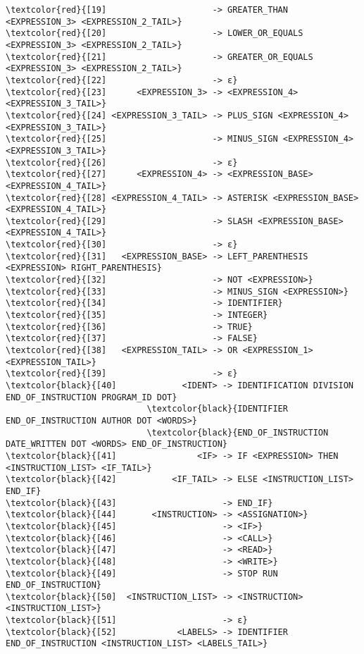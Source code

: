 \begin{Verbatim}[commandchars=\\\{\}]
\textcolor{red}{[19]                     -> GREATER_THAN <EXPRESSION_3> <EXPRESSION_2_TAIL>}
\textcolor{red}{[20]                     -> LOWER_OR_EQUALS <EXPRESSION_3> <EXPRESSION_2_TAIL>}
\textcolor{red}{[21]                     -> GREATER_OR_EQUALS <EXPRESSION_3> <EXPRESSION_2_TAIL>}
\textcolor{red}{[22]                     -> ε}
\textcolor{red}{[23]      <EXPRESSION_3> -> <EXPRESSION_4> <EXPRESSION_3_TAIL>}
\textcolor{red}{[24] <EXPRESSION_3_TAIL> -> PLUS_SIGN <EXPRESSION_4> <EXPRESSION_3_TAIL>}
\textcolor{red}{[25]                     -> MINUS_SIGN <EXPRESSION_4> <EXPRESSION_3_TAIL>}
\textcolor{red}{[26]                     -> ε}
\textcolor{red}{[27]      <EXPRESSION_4> -> <EXPRESSION_BASE> <EXPRESSION_4_TAIL>}
\textcolor{red}{[28] <EXPRESSION_4_TAIL> -> ASTERISK <EXPRESSION_BASE> <EXPRESSION_4_TAIL>}
\textcolor{red}{[29]                     -> SLASH <EXPRESSION_BASE> <EXPRESSION_4_TAIL>}
\textcolor{red}{[30]                     -> ε}
\textcolor{red}{[31]   <EXPRESSION_BASE> -> LEFT_PARENTHESIS <EXPRESSION> RIGHT_PARENTHESIS}
\textcolor{red}{[32]                     -> NOT <EXPRESSION>}
\textcolor{red}{[33]                     -> MINUS_SIGN <EXPRESSION>}
\textcolor{red}{[34]                     -> IDENTIFIER}
\textcolor{red}{[35]                     -> INTEGER}
\textcolor{red}{[36]                     -> TRUE}
\textcolor{red}{[37]                     -> FALSE}
\textcolor{red}{[38]   <EXPRESSION_TAIL> -> OR <EXPRESSION_1> <EXPRESSION_TAIL>}
\textcolor{red}{[39]                     -> ε}
\textcolor{black}{[40]             <IDENT> -> IDENTIFICATION DIVISION END_OF_INSTRUCTION PROGRAM_ID DOT}
                            \textcolor{black}{IDENTIFIER END_OF_INSTRUCTION AUTHOR DOT <WORDS>}
                            \textcolor{black}{END_OF_INSTRUCTION DATE_WRITTEN DOT <WORDS> END_OF_INSTRUCTION}
\textcolor{black}{[41]                <IF> -> IF <EXPRESSION> THEN <INSTRUCTION_LIST> <IF_TAIL>}
\textcolor{black}{[42]           <IF_TAIL> -> ELSE <INSTRUCTION_LIST> END_IF}
\textcolor{black}{[43]                     -> END_IF}
\textcolor{black}{[44]       <INSTRUCTION> -> <ASSIGNATION>}
\textcolor{black}{[45]                     -> <IF>}
\textcolor{black}{[46]                     -> <CALL>}
\textcolor{black}{[47]                     -> <READ>}
\textcolor{black}{[48]                     -> <WRITE>}
\textcolor{black}{[49]                     -> STOP RUN END_OF_INSTRUCTION}
\textcolor{black}{[50]  <INSTRUCTION_LIST> -> <INSTRUCTION> <INSTRUCTION_LIST>}
\textcolor{black}{[51]                     -> ε}
\textcolor{black}{[52]            <LABELS> -> IDENTIFIER END_OF_INSTRUCTION <INSTRUCTION_LIST> <LABELS_TAIL>}

\end{Verbatim}
